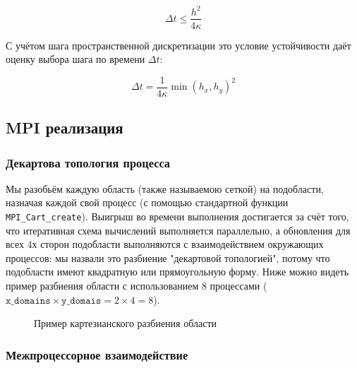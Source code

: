 \documentclass[a4paper]{extarticle}
\begin{document}
\begin{equation}
	\Delta{t}\leqslant\frac{h^2}{4\kappa}
\end{equation}

С учётом шага пространственной дискретизации это условие устойчивости даёт оценку выбора шага по времени $\Delta{t}$:

\begin{equation}
\Delta{t} = \frac{1}{4\kappa}\min(h_x,h_y)^2
\end{equation}

\subsection{MPI реализация}

\setcounter{figure}{0}

\subsubsection{Декартова топология процесса}

Мы разобьём каждую область (также называемою сеткой) на подобласти, назначая каждой свой процесс (с помощью стандартной функции \\ \texttt{MPI\_Cart\_create}{\cite{mpidoc}}). Выигрыш во времени выполнения достигается за счёт того, что итеративная схема вычислений выполняется параллельно, а обновления для всех 4х сторон подобласти выполняются с взаимодействием окружающих процессов: мы назвали это разбиение "декартовой топологией", потому что подобласти имеют квадратную или прямоугольную форму. Ниже можно видеть пример разбиения области с использованием 8 процессами ($\mathtt{x\_domains} \times \mathtt{y\_domais} = 2 \times 4 = 8$).

\begin{figure}[h]
\centering
{}
\captionsetup{labelfont=bf, labelsep=space}
\caption{Пример картезианского разбиения области}
\end{figure}

\subsubsection{Межпроцессорное взаимодействие}
\end{document}

